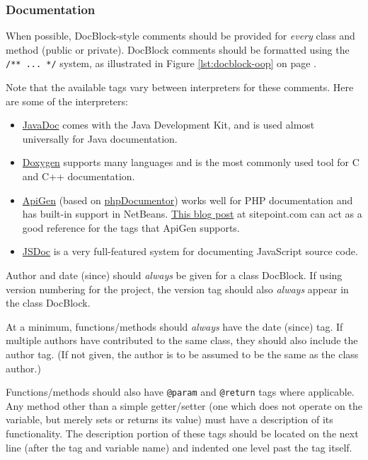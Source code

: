 \documentclass[12pt,letter]{memoir} %
\begin{document}
		\subsubsection{Documentation}
			When possible, DocBlock-style comments should be provided for
			\emph{every} class and method (public or private). DocBlock comments
			should be formatted using the \texttt{/** ... */} system, as
			illustrated in Figure \ref{lst:docblock-oop} on page
			\pageref{lst:docblock-oop}.

			Note that the available tags vary between
			interpreters for these comments. Here are some of the interpreters:
			\begin{itemize}
				\item \href{http://www.oracle.com/technetwork/java/javase/documentation/index-jsp-135444.html}{JavaDoc}
					comes with the Java Development Kit, and is used almost
					universally for Java documentation.
				\item \href{http://www.stack.nl/~dimitri/doxygen/}{Doxygen}
					supports many languages and is the most commonly used tool
					for C and C++ documentation.
				\item \href{http://apigen.org/}{ApiGen} (based on
					\href{http://www.phpdoc.org/}{phpDocumentor}) works well for
					PHP documentation and has built-in support in NetBeans.
					\href{http://www.sitepoint.com/generate-documentation-with-apigen/}{This blog post}
					at sitepoint.com can act as a good reference for the tags
					that ApiGen supports.
				\item \href{http://usejsdoc.org}{JSDoc} is a very full-featured
					system for documenting JavaScript source code.
			\end{itemize}

			Author and date (since) should \emph{always} be given for a class
			DocBlock. If using version numbering for the project, the version
			tag should also \emph{always} appear in the class DocBlock.

			At a minimum, functions/methods should \emph{always} have the date
			(since) tag. If multiple authors have contributed to the same class,
			they should also include the author tag. (If not given, the author
			is to be assumed to be the same as the class author.)

			Functions/methods should also have \texttt{@param} and
			\texttt{@return} tags where applicable. Any method other than a
			simple getter/setter (one which does not operate on the variable,
			but merely sets or returns its value) must have a description of its
			functionality. The description portion of these tags should be
			located on the next line (after the tag and variable name) and
			indented one level past the tag itself.
\end{document}
